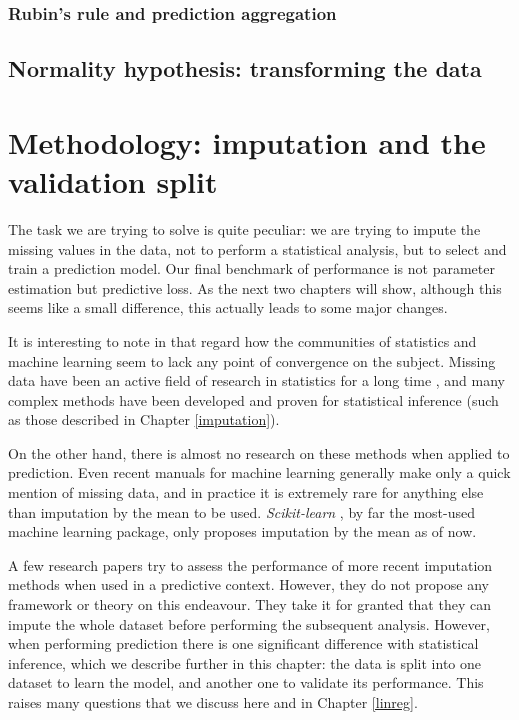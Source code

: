 \documentclass[12pt, a4paper]{memoir}
\begin{document}
		\subsection{Rubin's rule and prediction aggregation}
	\section{Normality hypothesis: transforming the data}
		
\chapter{Methodology: imputation and the validation split}
\label{validation}
The task we are trying to solve is quite peculiar: we are trying to impute the missing values in the data, not to perform a statistical analysis, but to select and train a prediction model. Our final benchmark of performance is not parameter estimation but predictive loss. As the next two chapters will show, although this seems like a small difference, this actually leads to some major changes.

It is interesting to note in that regard how the communities of statistics and machine learning seem to lack any point of convergence on the subject. Missing data have been an active field of research in statistics for a long time \cite{rubin1976inference}, and many complex methods have been developed and proven for statistical inference \cite{Rubin_missdata} (such as those described in Chapter \ref{imputation}).

On the other hand, there is almost no research on these methods when applied to prediction. Even recent manuals for machine learning \cite{ML_missdata} generally make only a quick mention of missing data, and in practice it is extremely rare for anything else than imputation by the mean to be used. \emph{Scikit-learn} \cite{scikit-learn}, by far the most-used machine learning package, only proposes imputation by the mean as of now. 

A few research papers \cite{prediction_imputation1} \cite{prediction_imputation2} try to assess the performance of more recent imputation methods when used in a predictive context. However, they do not propose any framework or theory on this endeavour. They take it for granted that they can impute the whole dataset before performing the subsequent analysis. However, when performing prediction there is one significant difference with statistical inference, which we describe further in this chapter: the data is split into one dataset to learn the model, and another one to validate its performance. This raises many questions that we discuss here and in Chapter \ref{linreg}. 
\end{document}
